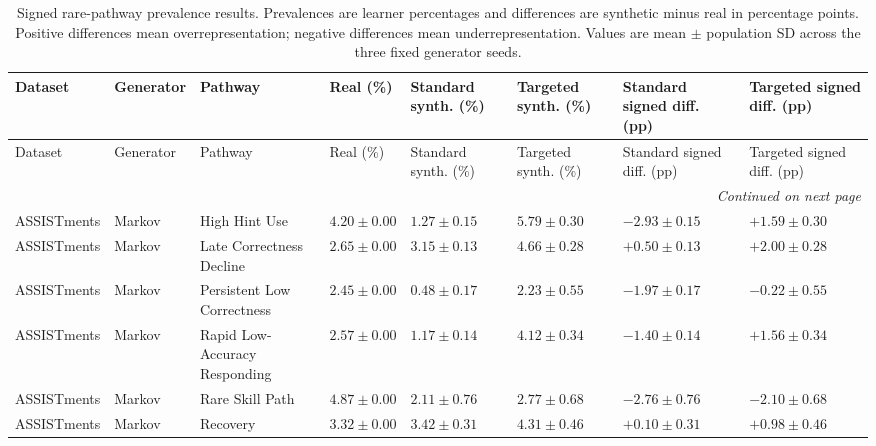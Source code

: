 \begingroup
\fontsize{6.8}{7.6}\selectfont
\renewcommand{\arraystretch}{0.90}
\setlength{\tabcolsep}{3pt}
\setlength{\LTpre}{2pt}
\setlength{\LTpost}{2pt}
\begin{longtable}{@{}p{2.0cm}p{1.8cm}p{3.1cm}p{2.0cm}p{2.25cm}p{2.25cm}p{2.35cm}p{2.35cm}@{}}
\caption{Signed rare-pathway prevalence results. Prevalences are learner percentages and differences are synthetic minus real in percentage points. Positive differences mean overrepresentation; negative differences mean underrepresentation. Values are mean $\pm$ population SD across the three fixed generator seeds.}\label{tab:supp-signed-prevalence}\\
\toprule
Dataset & Generator & Pathway & Real (\%) & Standard synth. (\%) & Targeted synth. (\%) & Standard signed diff. (pp) & Targeted signed diff. (pp) \\
\midrule
\endfirsthead
\toprule
Dataset & Generator & Pathway & Real (\%) & Standard synth. (\%) & Targeted synth. (\%) & Standard signed diff. (pp) & Targeted signed diff. (pp) \\
\midrule
\endhead
\midrule
\multicolumn{8}{r}{\textit{Continued on next page}}\\
\endfoot
\bottomrule
\endlastfoot
ASSISTments & Markov & High Hint Use & $4.20 \mathbin{\pm} 0.00$ & $1.27 \mathbin{\pm} 0.15$ & $5.79 \mathbin{\pm} 0.30$ & $-2.93 \mathbin{\pm} 0.15$ & $+1.59 \mathbin{\pm} 0.30$ \\
ASSISTments & Markov & Late Correctness Decline & $2.65 \mathbin{\pm} 0.00$ & $3.15 \mathbin{\pm} 0.13$ & $4.66 \mathbin{\pm} 0.28$ & $+0.50 \mathbin{\pm} 0.13$ & $+2.00 \mathbin{\pm} 0.28$ \\
ASSISTments & Markov & Persistent Low Correctness & $2.45 \mathbin{\pm} 0.00$ & $0.48 \mathbin{\pm} 0.17$ & $2.23 \mathbin{\pm} 0.55$ & $-1.97 \mathbin{\pm} 0.17$ & $-0.22 \mathbin{\pm} 0.55$ \\
ASSISTments & Markov & Rapid Low-Accuracy Responding & $2.57 \mathbin{\pm} 0.00$ & $1.17 \mathbin{\pm} 0.14$ & $4.12 \mathbin{\pm} 0.34$ & $-1.40 \mathbin{\pm} 0.14$ & $+1.56 \mathbin{\pm} 0.34$ \\
ASSISTments & Markov & Rare Skill Path & $4.87 \mathbin{\pm} 0.00$ & $2.11 \mathbin{\pm} 0.76$ & $2.77 \mathbin{\pm} 0.68$ & $-2.76 \mathbin{\pm} 0.76$ & $-2.10 \mathbin{\pm} 0.68$ \\
ASSISTments & Markov & Recovery & $3.32 \mathbin{\pm} 0.00$ & $3.42 \mathbin{\pm} 0.31$ & $4.31 \mathbin{\pm} 0.46$ & $+0.10 \mathbin{\pm} 0.31$ & $+0.98 \mathbin{\pm} 0.46$ \\

\end{longtable}
